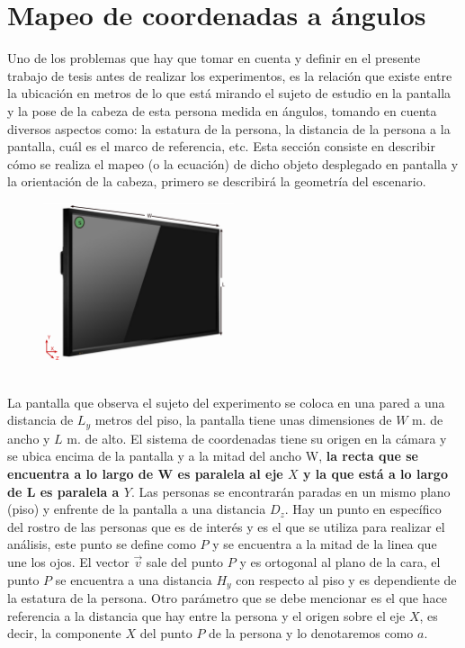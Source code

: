     \section{Mapeo de coordenadas a ángulos}
    Uno de los problemas que hay que tomar en cuenta y definir en el presente trabajo de tesis antes de realizar los experimentos, es la relación que existe entre la ubicación en metros de lo que está mirando el sujeto de estudio en la pantalla y la pose de la cabeza de esta persona medida en ángulos, tomando en cuenta diversos aspectos como: la estatura de la persona, la distancia de la persona a la pantalla, cuál es el marco de referencia, etc. Esta sección consiste en describir cómo se realiza el mapeo (o la ecuación) de dicho objeto desplegado en pantalla y la orientación de la cabeza, primero se describirá la geometría del escenario. 
    \begin{figure}[htbp]
    	\centering
    	\includegraphics[width=0.5\textwidth]{./pictures/pantalla2}
    	\caption{}\label{fig: figura}
    \end{figure}   
    \\La pantalla que observa el sujeto del experimento se coloca en una pared a una distancia de $L_y$ metros del piso, la pantalla tiene unas dimensiones de $W$ m. de ancho y $L$ m. de alto. El sistema de coordenadas tiene su origen en la cámara y se ubica  encima de la pantalla y a la mitad del ancho W, \textbf{la recta que se encuentra a lo largo de W es paralela al eje $X$ y la que está a lo largo de L es paralela a $Y$}. Las personas se encontrarán paradas en un mismo plano (piso) y enfrente de la pantalla a una distancia $D_z$. Hay un punto en específico del rostro de las personas que es de interés y es el que se utiliza para realizar el análisis, este punto se define como $P$ y se encuentra a la mitad de la linea que une los ojos. El vector $\vec v$ sale del punto $P$ y es ortogonal al plano de la cara, el punto $P$ se encuentra a una distancia $H_y$ con respecto al piso y es dependiente de la estatura de la persona. Otro parámetro que se debe mencionar es el que hace referencia a la distancia que hay entre la persona y el origen sobre el eje $X$, es decir, la componente $X$ del punto $P$ de la persona y lo denotaremos como $a$.%
